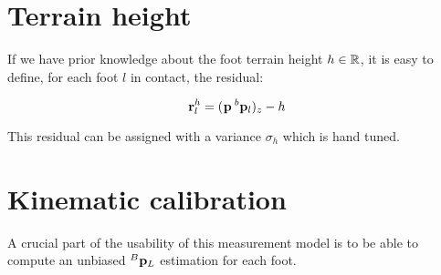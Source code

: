 \section{Terrain height}

If we have prior knowledge about the foot terrain height $h \in \mathbb{R}$, it is easy to define, for each foot $l$ in contact, the residual:

\begin{equation}
    {\bf r}^h_l = (\prescript{}{}{{\bf p}}_{} \prescript{b}{}{{\bf p}}_{l})_z - h
\end{equation}

This residual can be assigned with a variance $\sigma_h$ which is hand tuned.

\section{Kinematic calibration}
A crucial part of the usability of this measurement model is to be able to compute an unbiased $\prescript{B}{}{{\bf p}}_{L}$ estimation for each foot.
